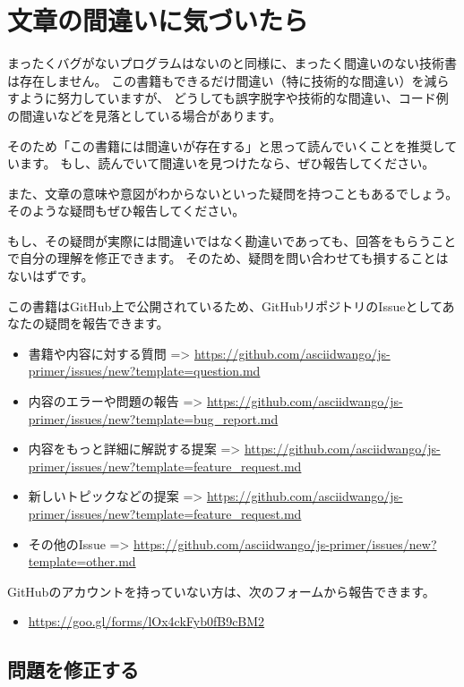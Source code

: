 \hypertarget{how-to-report-mistake}{%
\section*{文章の間違いに気づいたら}\label{how-to-report-mistake}}

まったくバグがないプログラムはないのと同様に、まったく間違いのない技術書は存在しません。
この書籍もできるだけ間違い（特に技術的な間違い）を減らすように努力していますが、
どうしても誤字脱字や技術的な間違い、コード例の間違いなどを見落としている場合があります。

そのため「この書籍には間違いが存在する」と思って読んでいくことを推奨しています。
もし、読んでいて間違いを見つけたなら、ぜひ報告してください。

また、文章の意味や意図がわからないといった疑問を持つこともあるでしょう。
そのような疑問もぜひ報告してください。

もし、その疑問が実際には間違いではなく勘違いであっても、回答をもらうことで自分の理解を修正できます。
そのため、疑問を問い合わせても損することはないはずです。

この書籍はGitHub上で公開されているため、GitHubリポジトリのIssueとしてあなたの疑問を報告できます。

\begin{itemize}
\item
  書籍や内容に対する質問 =\textgreater{}
  \url{https://github.com/asciidwango/js-primer/issues/new?template=question.md}
\item
  内容のエラーや問題の報告 =\textgreater{}
  \url{https://github.com/asciidwango/js-primer/issues/new?template=bug_report.md}
\item
  内容をもっと詳細に解説する提案 =\textgreater{}
  \url{https://github.com/asciidwango/js-primer/issues/new?template=feature_request.md}
\item
  新しいトピックなどの提案 =\textgreater{}
  \url{https://github.com/asciidwango/js-primer/issues/new?template=feature_request.md}
\item
  その他のIssue =\textgreater{}
  \url{https://github.com/asciidwango/js-primer/issues/new?template=other.md}
\end{itemize}

GitHubのアカウントを持っていない方は、次のフォームから報告できます。
\begin{itemize}
\item \url{https://goo.gl/forms/lOx4ckFyb0fB9cBM2}
\end{itemize}

\hypertarget{pull-request}{%
\subsection*{問題を修正する}\label{pull-request}}

